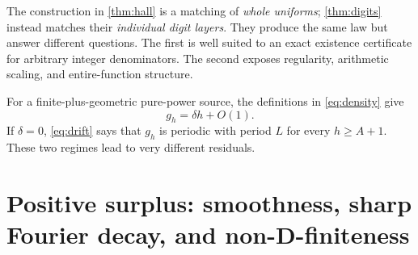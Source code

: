 \documentclass[11pt,a4paper]{article}
\theoremstyle{remark}
\begin{document}
The construction in \cref{thm:hall} is a matching of \emph{whole uniforms};
\cref{thm:digits} instead matches their \emph{individual digit layers}. They
produce the same law but answer different questions. The first is well suited
to an exact existence certificate for arbitrary integer denominators. The
second exposes regularity, arithmetic scaling, and entire-function structure.

For a finite-plus-geometric pure-power source, the definitions in
\eqref{eq:density} give
\begin{equation}
 g_h=\delta h+O(1).
 \label{eq:slack-asymptotic}
\end{equation}
If $\delta=0$, \eqref{eq:drift} says that $g_h$ is periodic with period $L$
for every $h\ge A+1$. These two regimes lead to very different residuals.

\section{Positive surplus: smoothness, sharp Fourier decay, and non-D-finiteness}
\label{sec:smooth}
\end{document}
